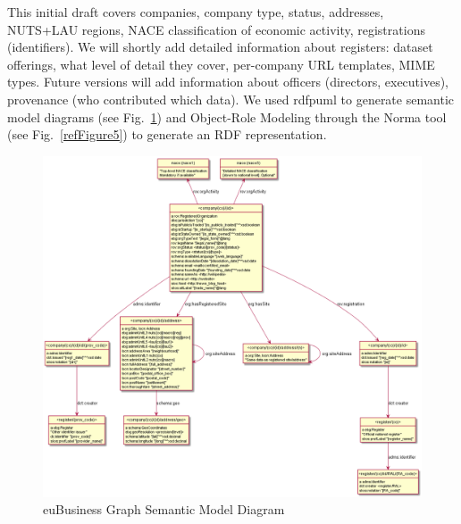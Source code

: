 \documentclass[runningheads,a4paper]{llncs}
\makeatletter
\def\maxwidth#1{\ifdim\Gin@nat@width>#1 #1\else\Gin@nat@width\fi}
\makeatother
\begin{document}
This initial draft covers companies, company type, status, addresses, NUTS+LAU regions, NACE classification of economic activity, registrations (identifiers). We will shortly add detailed information about registers: dataset offerings, what level of detail they cover, per-company URL templates, MIME types. Future versions will add information about officers (directors, executives), provenance (who contributed which data). We used rdfpuml  \cite{_Ref491195157} to generate semantic model diagrams (see Fig.~\ref{refFigure4}) and Object-Role Modeling through the Norma tool  \cite{_Ref491195242} (see Fig.~\ref{refFigure5}) to generate an RDF representation.
\begin{figure}[h!]
\centering
\includegraphics[width=\maxwidth{\textwidth}]{img/100000000000048C00000419A8A0F6AE07037D76.png}
\cprotect\caption{euBusiness Graph Semantic Model Diagram}
\label{refFigure4}
\end{figure}
\end{document}
